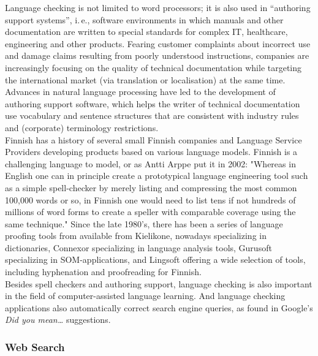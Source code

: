 \begin{multicols}{2}

Language checking is not limited to word processors; it is also used
in “authoring support systems”, i.\,e., software environments in which
manuals and other documentation are written to special standards for
complex IT, healthcare, engineering and other products. Fearing
customer complaints about incorrect use and damage claims resulting
from poorly understood instructions, companies are increasingly
focusing on the quality of technical documentation while targeting the
international market (via translation or localisation) at the same
time. Advances in natural language processing have led to the
development of authoring support software, which helps the writer of
technical documentation use vocabulary and sentence structures that
are consistent with industry rules and (corporate) terminology
restrictions.\\
Finnish has a history of several small Finnish companies and Language
Service Providers developing products based on various language
models. Finnish is a challenging language to model, or as Antti Arppe
put it in 2002: "Whereas in English one can in principle create a
prototypical language engineering tool such as a simple spell-checker
by merely listing and compressing the most common 100,000 words or so,
in Finnish one would need to list tens if not hundreds of millions of
word forms to create a speller with comparable coverage using the same
technique." \cite{NoPath} Since the late 1980's, there has been a
series of language proofing tools from available from Kielikone,
nowadays specializing in dictionaries, Connexor specializing in
language analysis tools, Gurusoft specializing in SOM-applications,
and Lingsoft offering a wide selection of tools,
including hyphenation and proofreading for Finnish.\\
Besides spell checkers and authoring support, language checking is
also important in the field of computer-assisted language
learning. And language checking applications also automatically
correct search engine queries, as found in Google's \textit{Did you
mean\dots} suggestions.

\subsubsection{Web Search}


\end{multicols}
